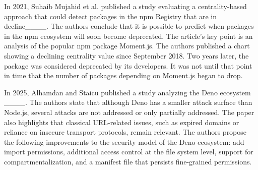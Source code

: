 
In 2021, Suhaib Mujahid et al. published a study evaluating a centrality-based approach that could detect packages in the npm Registry that are in decline____.
The authors conclude that it is possible to predict when packages in the npm ecosystem will soon become deprecated.
The article's key point is an analysis of the popular npm package Moment.js. The authors published a chart showing a declining centrality value since September 2018.
Two years later, the package was considered deprecated by its developers.
It was not until that point in time that the number of packages depending on Moment.js began to drop.


In 2025, Alhamdan and Staicu published a study analyzing the Deno ecosystem ____.
The authors state that although Deno has a smaller attack surface than Node.js, several attacks are not addressed or only partially addressed.
The paper also highlights that classical URL-related issues, such as expired domains or reliance on insecure transport protocols, remain relevant.
The authors propose the following improvements to the security model of the Deno ecosystem: add import permissions, additional access control at the file system level, support for compartmentalization, and a manifest file that persists fine-grained permissions.

